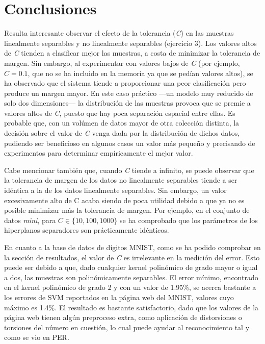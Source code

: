 \documentclass[a4paper]{article}
\begin{document}
\section{Conclusiones}
\quad Resulta interesante observar el efecto de la tolerancia (\textit{C}) en las muestras linealmente separables y no linealmente separables (ejercicio 3). Los valores altos de \textit{C} tienden a clasificar mejor las muestras, a costa de minimizar la tolerancia de margen. Sin embargo, al experimentar con valores bajos de \textit{C} (por ejemplo, $C=0.1$, que no se ha incluido en la memoria ya que se pedían valores altos), se ha observado que el sistema tiende a proporcionar una peor clasificación pero produce un margen mayor. En este caso práctico ---un modelo muy reducido de solo dos dimensiones--- la distribución de las muestras provoca que se premie a valores altos de \textit{C}, puesto que hay poca separación espacial entre ellas. Es probable que, con un volúmen de datos mayor de otra colección distinta, la decisión sobre el valor de \textit{C} venga dada por la distribución de dichos datos, pudiendo ser beneficioso en algunos casos un valor más pequeño y precisando de experimentos para determinar empíricamente el mejor valor.

\quad Cabe mencionar también que, cuando \textit{C} tiende a infinito, se puede observar que la tolerancia de margen de los datos no linealmente separables tiende a ser idéntica a la de los datos linealmente separables. Sin embargo, un valor excesivamente alto de C acaba siendo de poca utilidad debido a que ya no es posible minimizar más la tolerancia de margen. Por ejemplo, en el conjunto de datos \textit{mini}, para $C \in \lbrace 10, 100, 1000 \rbrace$  se ha comprobado que los parámetros de los hiperplanos separadores son prácticamente idénticos.

\quad En cuanto a la base de datos de dígitos MNIST, como se ha podido comprobar en la sección de resultados, el valor de \textit{C} es irrelevante en la medición del error. Esto puede ser debido a que, dado cualquier kernel polinómico de grado mayor o igual a dos, las muestras son polinómicamente separables. El error mínimo, encontrado en el kernel polinómico de grado 2 y con un valor de 1.95\%, se acerca bastante a los errores de SVM reportados en la página web del MNIST, valores cuyo máximo es 1.4\%. El resultado es bastante satisfactorio, dado que los valores de la página web tienen algún preproceso extra, como aplicación de distorsiones o torsiones del número en cuestión, lo cual puede ayudar al reconocimiento tal y como se vio en PER.
\end{document}
